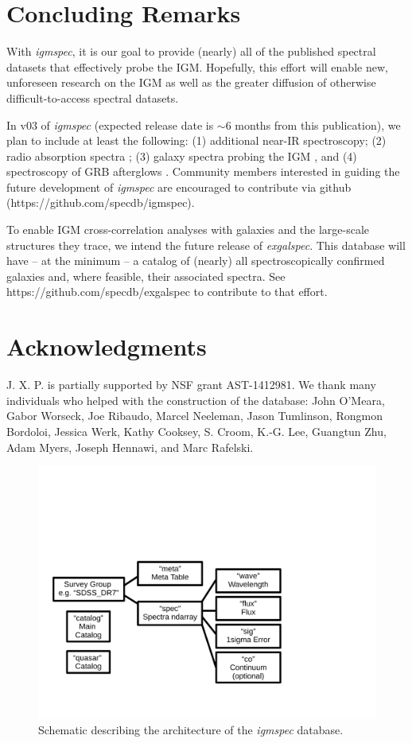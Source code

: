 \documentclass[12pt]{elsarticle}
\begin{document}
\section{Concluding Remarks}
\label{sec:end}

With {\it igmspec}, it is our goal to provide (nearly)
all of the published spectral datasets that effectively
probe the IGM.  Hopefully, this effort will
enable new, unforeseen research on the IGM as well
as the greater diffusion of otherwise difficult-to-access spectral
datasets.  

In v03 of
{\it igmspec} (expected release date is $\sim 6$ months from
this publication), we plan to include at least the following:
(1) additional near-IR spectroscopy;
(2) radio absorption spectra \citep[e.g. 21\,cm;][]{kanekar+14};
(3) galaxy spectra probing the IGM \citep[e.g.][]{rpk+10}, 
and
(4) spectroscopy of GRB afterglows \citep[e.g.][]{fjp+09}.
Community members interested in guiding the future development
of {\it igmspec} are encouraged to contribute via github
(https://github.com/specdb/igmspec).

To enable IGM cross-correlation analyses with galaxies
and the large-scale structures they trace,
we intend the future release of {\it exgalspec}.
This database will have -- at
the minimum -- a catalog of (nearly) all spectroscopically
confirmed galaxies and, where feasible, their associated
spectra.  See https://github.com/specdb/exgalspec
to contribute to that effort.


\section{Acknowledgments}

J. X. P. is partially supported by NSF grant AST-1412981.
We thank many individuals who helped with the construction
of the database:
John O'Meara, Gabor Worseck, Joe Ribaudo, Marcel Neeleman,
Jason Tumlinson, Rongmon Bordoloi, Jessica Werk,
Kathy Cooksey, S. Croom, K.-G. Lee, Guangtun Zhu,
Adam Myers, Joseph Hennawi,  and Marc Rafelski.






%
%


\begin{figure}
\includegraphics[width=6in]{architecture_v02.pdf}
\caption{Schematic describing the architecture of 
the {\it igmspec} database.
}
\label{fig:arch}
\end{figure}
\end{document}

